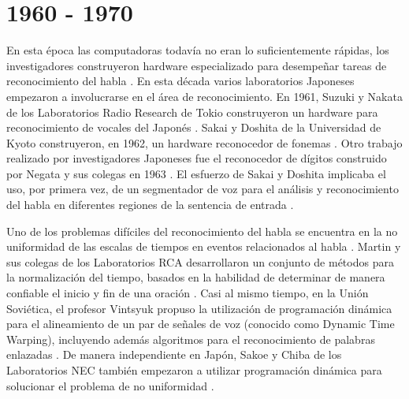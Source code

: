 \section{1960 - 1970}
\label{sec:60s}

En esta \'{e}poca las computadoras todav\'{i}a no eran lo suficientemente r\'{a}pidas, los investigadores
construyeron hardware especializado para desempe\~{n}ar tareas de reconocimiento del habla \cite{Furui50Years2004}.
En esta d\'{e}cada varios laboratorios Japoneses empezaron a involucrarse en el \'{a}rea de reconocimiento. En 1961,
Suzuki y Nakata de los Laboratorios Radio Research de Tokio construyeron un hardware para reconocimiento de vocales
del Japon\'{e}s \cite{SuzukiRecognition1961}. Sakai y Doshita de la Universidad de Kyoto construyeron, en 1962, un
hardware reconocedor de fonemas \cite{SakaiThePhonetic1962}. Otro trabajo realizado por investigadores Japoneses fue
el reconocedor de d\'{i}gitos construido por Negata y sus colegas en 1963 \cite{NagataSpoken1963}. El esfuerzo de
Sakai y Doshita implicaba el uso, por primera vez, de un segmentador de voz para el an\'{a}lisis y reconocimiento
del habla en diferentes regiones de la sentencia de entrada \cite{JaisalAReview2012}.

Uno de los problemas dif\'{i}ciles del reconocimiento del habla se encuentra en la no uniformidad de las escalas de
tiempos en eventos relacionados al habla \cite{Furui50Years2004}. Martin y sus colegas de los Laboratorios RCA
desarrollaron un conjunto de m\'{e}todos para la normalizaci\'{o}n del tiempo, basados en la habilidad de determinar
de manera confiable el inicio y fin de una oraci\'{o}n \cite{MartinSpeech1964}. Casi al mismo tiempo, en la Uni\'{o}n
Sovi\'{e}tica, el profesor Vintsyuk propuso la utilizaci\'{o}n de programaci\'{o}n din\'{a}mica para el alineamiento de un par
de se\~{n}ales de voz (conocido como Dynamic Time Warping), incluyendo adem\'{a}s algoritmos para el 
reconocimiento de palabras enlazadas \cite{VintsyukSpeech1968}. De manera independiente en Jap\'{o}n, Sakoe y Chiba de los
Laboratorios NEC tambi\'{e}n empezaron a utilizar programaci\'{o}n din\'{a}mica para solucionar el problema de no uniformidad
\cite{SakoeDynamic1978}.
